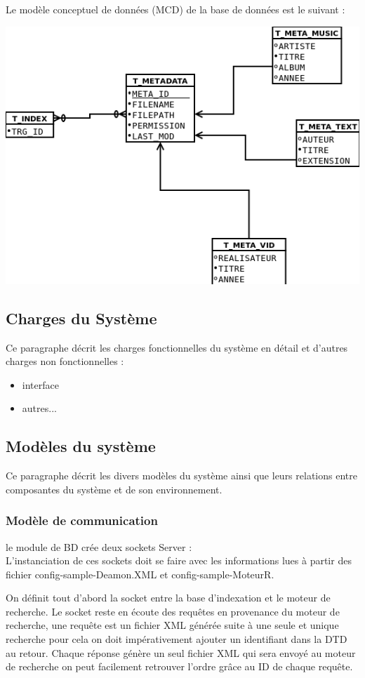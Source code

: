 Le modèle conceptuel de données (MCD) de la base de données est le suivant :
\begin{center}
\includegraphics[scale=0.7]{mcd.png}
\end{center}


\subsection{Charges du Système}
Ce paragraphe décrit les charges fonctionnelles du système en détail et d'autres charges non fonctionnelles : 
\begin{itemize}
 \item interface
 \item autres...
\end{itemize}

\subsection{Modèles du système}
Ce paragraphe décrit les divers modèles du système ainsi que leurs relations entre composantes du système et de son environnement.

\subsubsection{Modèle de communication}
le module de BD crée deux sockets Server :\\
L’instanciation de ces sockets doit se faire avec les informations lues à partir des fichier config-sample-Deamon.XML et config-sample-MoteurR.

On définit tout d'abord la socket entre la base d'indexation et le moteur de recherche. Le socket reste en écoute 
des requêtes en provenance du moteur de recherche, une requête est un fichier XML générée suite à une seule et unique recherche pour 
cela on doit impérativement ajouter un identifiant dans la DTD au retour. Chaque réponse génère un seul fichier 
XML qui sera envoyé au moteur de recherche on peut facilement retrouver l'ordre grâce au ID de chaque requête. 

